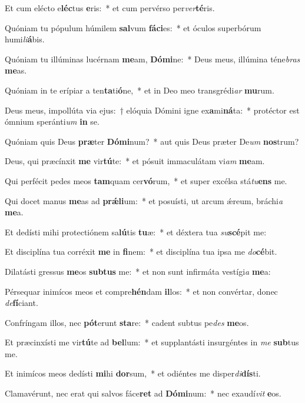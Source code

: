 \item Et cum elécto e\textbf{léc}tus \textbf{e}ris:~* et cum pervérso per\textit{ver}\textbf{té}ris.
\item Quóniam tu pópulum húmilem \textbf{sal}vum \textbf{fá}\textbf{ci}es:~* et óculos superbórum humi\textit{li}\textbf{á}bis.
\item Quóniam tu illúminas lucérnam \textbf{me}am, \textbf{Dó}\textbf{mi}ne:~* Deus meus, illúmina téne\textit{bras} \textbf{me}as.
\item Quóniam in te erípiar a ten\textbf{ta}ti\textbf{ó}ne,~* et in Deo meo transgrédi\textit{ar} \textbf{mu}rum.
\item Deus meus, impollúta via ejus:~† elóquia Dómini igne ex\textbf{a}mi\textbf{ná}ta:~* protéctor est ómnium speránti\textit{um} \textbf{in} se.
\item Quóniam quis Deus \textbf{præ}ter \textbf{Dó}\textbf{mi}num?~* aut quis Deus præter De\textit{um} \textbf{nos}trum?
\item Deus, qui præcínxit \textbf{me} vir\textbf{tú}te:~* et pósuit immaculátam vi\textit{am} \textbf{me}am.
\item Qui perfécit pedes meos \textbf{tam}quam cer\textbf{vó}rum,~* et super excélsa stá\textit{tu}\textbf{ens} me.
\item Qui docet manus \textbf{me}as ad \textbf{prǽ}\textbf{li}um:~* et posuísti, ut arcum ǽreum, bráchi\textit{a} \textbf{me}a.
\item Et dedísti mihi protectiónem sa\textbf{lú}tis \textbf{tu}æ:~* et déxtera tua \textit{su}\textbf{scé}pit me:
\item Et disciplína tua corréxit \textbf{me} in \textbf{fi}nem:~* et disciplína tua ipsa me \textit{do}\textbf{cé}bit.
\item Dilatásti gressus \textbf{me}os \textbf{sub}\textbf{tus} me:~* et non sunt infirmáta vestígi\textit{a} \textbf{me}a:
\item Pérsequar inimícos meos et compre\textbf{hén}dam \textbf{il}los:~* et non convértar, donec \textit{de}\textbf{fí}ciant.
\item Confríngam illos, nec \textbf{pót}erunt \textbf{sta}re:~* cadent subtus pe\textit{des} \textbf{me}os.
\item Et præcinxísti me vir\textbf{tú}te ad \textbf{bel}lum:~* et supplantásti insurgéntes in \textit{me} \textbf{sub}tus me.
\item Et inimícos meos dedísti \textbf{mi}hi \textbf{dor}sum,~* et odiéntes me disper\textit{di}\textbf{dís}ti.
\item Clamavérunt, nec erat qui salvos fáce\textbf{ret} ad \textbf{Dó}\textbf{mi}num:~* nec exaudí\textit{vit} \textbf{e}os.
